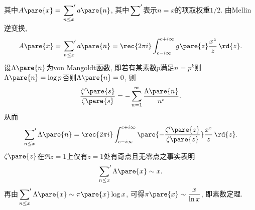 \documentclass[../ComplexVariable.tex]{subfiles}
\begin{document}
其中$\displaystyle A\pare{x} = \sideset{}{'}\sum_{n\le x} a\pare{n}$, 其中$\displaystyle \sideset{}{'}\sum$表示$n=x$的项取权重$1/2$. 由Mellin逆变换,
\[ A\pare{x} = \sideset{}{'}\sum_{n\le x} a\pare{n} = \rec{2\pi i}\int_{c-i\infty}^{c+i\infty}g\pare{z} \frac{x^z}{z}\,\rd{z}. \]
设$\Lambda\pare{n}$为von Mangoldt函数, 即若有某素数$p$满足$n=p^k$则$\Lambda\pare{n} = \log p$否则$\Lambda\pare{n} = 0$, 则
\[ \frac{\zeta'\pare{s}}{\zeta\pare{s}} = -\sum_{n=1}^\infty \frac{\Lambda\pare{n}}{n^s}. \]
从而
\[ \sideset{}{'}\sum_{n\le x} \Lambda\pare{n} = \rec{2\pi i}\int_{c-i\infty}^{c+i\infty} \pare{-\frac{\zeta'\pare{z}}{\zeta\pare{z}}}\frac{x^z}{z}\,\rd{z}. \]
$\zeta\pare{z}$在$\Re z = 1$上仅有$z=1$处有奇点且无零点之事实表明
\[ \sideset{}{'}\sum_{n\le x} \Lambda\pare{x} \sim x. \]
再由$\displaystyle \sideset{}{'}\sum_{n\le x} \Lambda\pare{x} \sim \pi\pare{x}\log x$, 可得$\displaystyle \pi\pare{x} \sim \frac{x}{\ln x}$, 即素数定理.


\end{document}
